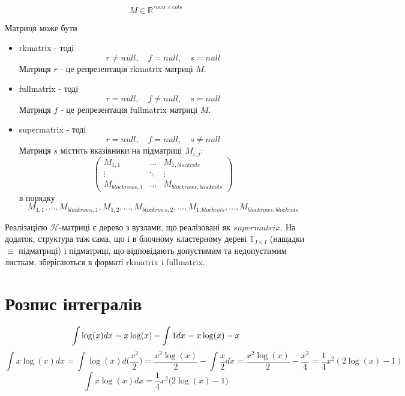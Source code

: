 \documentclass[12pt]{report}
\begin{document}
	$$M\in\mathbb{R}^{rows\times cols}$$
	\par Матриця може бути 
	\begin{itemize}
		\item rkmatrix - тоді 
		$$r\not=null,\quad
		f=null,\quad
		s=null$$
		Матриця $r$ - це репрезентація rkmatrix матриці $M$.
		\item fullmatrix - тоді  
		$$r=null,\quad
		f\not=null,\quad
		s=null$$
		Матриця $f$ - це репрезентація fullmatrix матриці $M$.
		\item supermatrix - тоді
		$$r=null,\quad
		f=null,\quad
		s\not=null$$
		Матриця $s$ містить вказівники на підматриці $M_{i,j}$:
		\[
			\begin{pmatrix}
				M_{1,1} & \dots & M_{1,blockcols}\\
				\vdots & \ddots & \vdots \\
				M_{blockrows,1} &\dots  & M_{blockrows,blockcols}
			\end{pmatrix}
		\]
		в порядку 
		$$M_{1,1},\dots,M_{blockrows,1},M_{1,2},\dots,M_{blockrows,2},\dots,M_{1,blockcols},\dots,M_{blockrows,blockcols}$$
	\end{itemize}
	\par Реалізацією $\mathcal{H}$-матриці є дерево з вузлами, що реалізовані як $supermatrix$. На додаток, структура таж сама, що і в блочному кластерному дереві $\mathbb{T}_{I\times I}$ (нащадки $\equiv$ підматриці) і підматриці, що відповідають допустимим та недопустимим листкам, зберігаються в форматі rkmatrix i fullmatrix.
	\section{Розпис інтегралів}
	\begin{equation}
		\int \log(x) dx = x\log(x)-\int 1 dx = x\log(x)-x\\
	\end{equation}
	$$\int x\log(x)dx=\int\log(x)d\Big(\frac{x^2}{2}\Big)=\frac{x^2\log(x)}{2}-\int \frac{x}{2}dx=\frac{x^2\log(x)}{2}-\frac{x^2}{4}=\frac{1}{4}x^2(2\log(x)-1)$$
	\begin{equation}
	\int x\log(x)dx=\frac{1}{4}x^2\big(2\log(x)-1\big)
	\end{equation}
\end{document}
